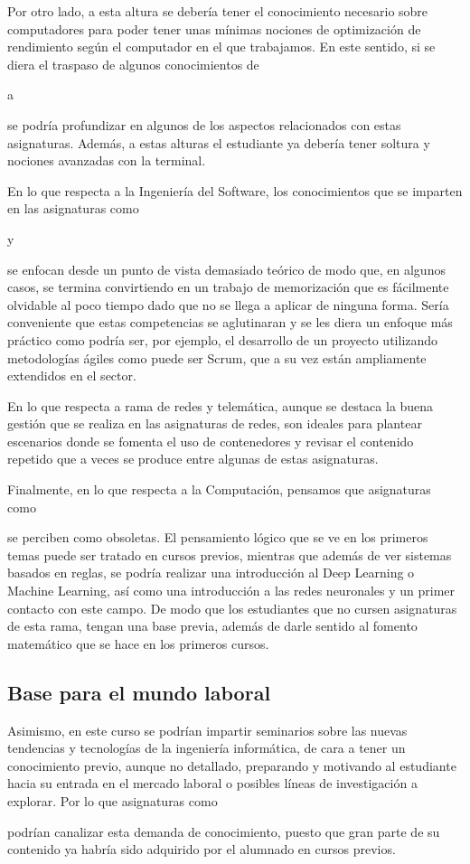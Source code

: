 Por otro lado, a esta altura se debería tener el conocimiento necesario sobre computadores 
para poder tener unas mínimas nociones de optimización de rendimiento según el computador 
en el que trabajamos. En este sentido, si se diera el traspaso de algunos conocimientos de 
\subject{Arquitectura y Organización de Computadores} a \subject{Ampliación de Estructura 
de Computadores} se podría profundizar en algunos de los aspectos relacionados con estas
asignaturas. Además, a estas alturas el estudiante ya debería tener soltura y nociones 
avanzadas con la terminal.

En lo que respecta a la Ingeniería del Software, los conocimientos que se imparten en las 
asignaturas como \subject{Procesos de Desarrollo Software} y \subject{Gestión de Proyectos 
de Desarrollo de Software} se enfocan desde un punto de vista demasiado teórico de modo que, 
en algunos casos, se termina convirtiendo en un trabajo de memorización que es fácilmente 
olvidable al poco tiempo dado que no se llega a aplicar de ninguna forma. Sería conveniente 
que estas competencias se aglutinaran y se les diera un enfoque más práctico como podría ser, 
por ejemplo, el desarrollo de un proyecto utilizando metodologías ágiles como puede ser Scrum, 
que a su vez están ampliamente extendidos en el sector.

En lo que respecta a rama de redes y telemática, aunque se destaca la buena gestión 
que se realiza en las asignaturas de redes, son ideales para plantear escenarios donde
se fomenta el uso de contenedores y revisar el contenido repetido que a veces se produce
entre algunas de estas asignaturas.

Finalmente, en lo que respecta a la Computación, pensamos que asignaturas como 
\subject{Sistemas inteligentes} se perciben como obsoletas. El pensamiento lógico que se ve 
en los primeros temas puede ser tratado en cursos previos, mientras que además de ver 
sistemas basados en reglas, se podría realizar una introducción al Deep Learning o Machine 
Learning, así como una introducción a las redes neuronales y un primer contacto con este 
campo. De modo que los estudiantes que no cursen asignaturas de esta rama, tengan una base previa, 
además de darle sentido al fomento matemático que se hace en los primeros cursos.


\subsection{Base para el mundo laboral}
Asimismo, en este curso se podrían impartir seminarios sobre las nuevas tendencias y 
tecnologías de la ingeniería informática, de cara a tener un conocimiento previo, aunque 
no detallado, preparando y motivando al estudiante hacia su entrada en el mercado laboral o 
posibles líneas de investigación a explorar. Por lo que asignaturas como 
\subject{Tecnologías Específicas de la Ingeniería Informática (TEII)} podrían canalizar 
esta demanda de conocimiento, puesto que gran parte de su contenido ya habría sido adquirido 
por el alumnado en cursos previos.

